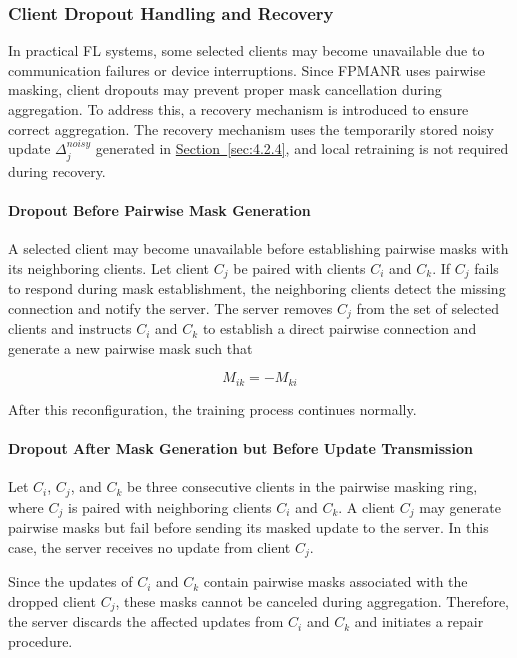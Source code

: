 \documentclass[a4paper,fleqn]{cas-dc}
\newcommand{\xsec}[1]{\hyperref[#1]{Section~\ref*{#1}}}
\begin{document}
\subsubsection{Client Dropout Handling and Recovery}
\label{sec:4.2.5}

In practical FL systems, some selected clients may become unavailable due to communication failures or device interruptions. Since FPMANR uses pairwise masking, client dropouts may prevent proper mask cancellation during aggregation. To address this, a recovery mechanism is introduced to ensure correct aggregation. The recovery mechanism uses the temporarily stored noisy update $\Delta_{j}^{noisy}$ generated in \xsec{sec:4.2.4}, and local retraining is not required during recovery.

\paragraph{Dropout Before Pairwise Mask Generation}
A selected client may become unavailable before establishing pairwise masks with its neighboring clients. Let client $C_{j}$ be paired with clients $C_{i}$ and $C_{k}$. If $C_{j}$ fails to respond during mask establishment, the neighboring clients detect the missing connection and notify the server. The server removes $C_{j}$ from the set of selected clients and instructs $C_{i}$ and $C_{k}$ to establish a direct pairwise connection and generate a new pairwise mask such that

\begin{equation}
M_{ik} = - M_{ki}
\label{eq:6}
\end{equation}

After this reconfiguration, the training process continues normally.

\paragraph{Dropout After Mask Generation but Before Update Transmission}
Let $C_{i}$, $C_{j}$, and $C_{k}$ be three consecutive clients in the pairwise masking ring, where $C_{j}$ is paired with neighboring clients $C_{i}$ and $C_{k}$. A client $C_{j}$ may generate pairwise masks but fail before sending its masked update to the server. In this case, the server receives no update from client $C_{j}$.

Since the updates of $C_{i}$ and $C_{k}$ contain pairwise masks associated with the dropped client $C_{j}$, these masks cannot be canceled during aggregation. Therefore, the server discards the affected updates from $C_{i}$ and $C_{k}$ and initiates a repair procedure.
\end{document}
